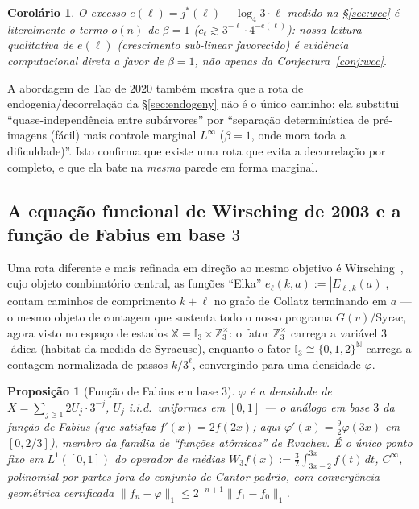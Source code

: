 \documentclass[11pt]{article}
\newtheorem{proposition}[theorem]{Proposição}
\newtheorem{corollary}[theorem]{Corolário}
\theoremstyle{definition}
\theoremstyle{remark}
\begin{document}
\begin{corollary}\label{cor:e-ell-beta}
O excesso $e(\ell)=j^\ast(\ell)-\log_4 3\cdot \ell$ medido na
\S\ref{sec:wcc} é literalmente o termo $o(n)$ de $\beta=1$
($c_\ell\gtrsim 3^{-\ell}\cdot 4^{-e(\ell)}$): nossa leitura
qualitativa de $e(\ell)$ (crescimento sub-linear favorecido) é
evidência computacional direta a favor de $\beta=1$, não apenas da
Conjectura~\ref{conj:wcc}.
\end{corollary}

A abordagem de Tao de $2020$ também mostra que a rota de
endogenia/decorrelação da \S\ref{sec:endogeny} não é o único caminho:
ela substitui ``quase-independência entre subárvores'' por
``separação determinística de pré-imagens (fácil) mais controle
marginal $L^\infty$ ($\beta=1$, onde mora toda a dificuldade)''. Isto
confirma que existe uma rota que evita a decorrelação por completo, e
que ela bate na \emph{mesma} parede em forma marginal.

\subsection{A equação funcional de Wirsching de 2003 e a função de
Fabius em base $3$}

Uma rota diferente e mais refinada em direção ao mesmo objetivo é
Wirsching~\cite{Wirsching2003}, cujo objeto combinatório central, as
funções ``Elka'' $e_\ell(k,a):=|E_{\ell,k}(a)|$, contam caminhos de
comprimento $k+\ell$ no grafo de Collatz terminando em $a$ --- o mesmo
objeto de contagem que sustenta todo o nosso programa
$G(v)/\mathrm{Syrac}$, agora visto no espaço de estados
$\mathbb{X}=\mathbb{I}_3\times \mathbb{Z}_3^\times$: o fator
$\mathbb{Z}_3^\times$ carrega a variável $3$-ádica (habitat da medida
de Syracuse), enquanto o fator $\mathbb{I}_3\cong\{0,1,2\}^{\mathbb{N}}$
carrega a contagem normalizada de passos $k/3^\ell$, convergindo para
uma densidade $\varphi$.

\begin{proposition}[Função de Fabius em base $3$]\label{prop:fabius}
$\varphi$ é a densidade de $X = \sum_{j\ge 1} 2U_j\cdot 3^{-j}$, $U_j$
i.i.d.\ uniformes em $[0,1]$ --- o análogo em base $3$ da função de
Fabius (que satisfaz $f'(x)=2f(2x)$; aqui $\varphi'(x) =
\tfrac{9}{2}\varphi(3x)$ em $[0,2/3]$), membro da família de
``funções atômicas'' de Rvachev. É o único ponto fixo em
$L^1([0,1])$ do operador de médias $W_3 f(x) := \tfrac{3}{2}
\int_{3x-2}^{3x} f(t)\,dt$, $C^\infty$, polinomial por partes fora do
conjunto de Cantor padrão, com convergência geométrica certificada
$\|f_n-\varphi\|_1\le 2^{-n+1}\|f_1-f_0\|_1$.
\end{proposition}
\end{document}
